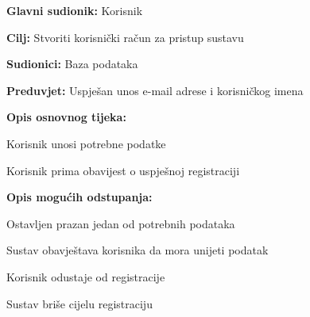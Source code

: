 					\noindent \label{UC2} 
					\begin{packed_item}
						
						\item \textbf{Glavni sudionik:} Korisnik
						\item  \textbf{Cilj:} Stvoriti korisnički račun za pristup sustavu
						\item  \textbf{Sudionici:} Baza podataka
						\item  \textbf{Preduvjet:} Uspješan unos e-mail adrese i korisničkog imena
						\item  \textbf{Opis osnovnog tijeka:}
						
						\item[] \begin{packed_enum}
							
							\item Korisnik unosi potrebne podatke
							\item Korisnik prima obavijest o uspješnoj registraciji
							
						\end{packed_enum}
						
						\item  \textbf{Opis mogućih odstupanja:}
						
						\item[] \begin{packed_item}
							
							\item[1.a] Ostavljen prazan jedan od potrebnih podataka
							\item[] \begin{packed_enum}
								
								\item Sustav obavještava korisnika da mora unijeti podatak
								
							\end{packed_enum}
							\item[1.b] Korisnik odustaje od registracije
							\item[] \begin{packed_enum}
								
								\item Sustav briše cijelu registraciju
								
							\end{packed_enum}
							
						\end{packed_item}
					\end{packed_item}
			
